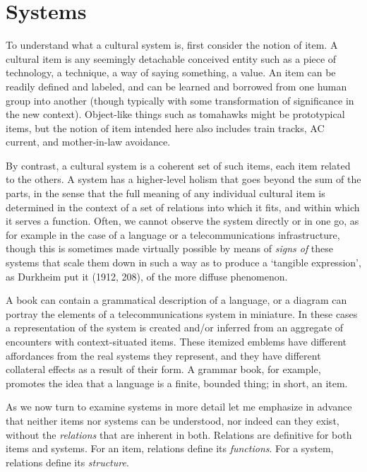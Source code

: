 \section{Systems}


To understand what a cultural system is, first consider the notion of 
item. A cultural item is any seemingly detachable conceived entity such 
as a piece of technology, a technique, a way of saying something, a 
value. An item can be readily defined and labeled, and can be learned 
and borrowed from one human group into another (though typically with 
some transformation of significance in the new context). Object-like 
things such as tomahawks might be prototypical items, but the notion of 
item intended here also includes train tracks, AC current, and 
mother-in-law avoidance. 



By contrast, a cultural system is a coherent set of such items, each 
item related to the others. A system has a higher-level holism that goes 
beyond the sum of the parts, in the sense that the full meaning of any 
individual cultural item is determined in the context of a set of 
relations into which it fits, and within which it serves a function. 
Often, we cannot observe the system directly or in one go, as for 
example in the case of a language or a telecommunications 
infrastructure, though this is sometimes made virtually possible by 
means of \textit{signs of} these systems that scale them down in such 
a way as to produce a \textquoteleft tangible expression', as Durkheim put it (1912, 
208), of the more diffuse phenomenon. 



A book can contain a grammatical description of a language, or a diagram 
can portray the elements of a telecommunications system in miniature. In 
these cases a representation of the system is created and/or inferred 
from an aggregate of encounters with context-situated items. These 
itemized emblems have different affordances from the real systems they 
represent, and they have different collateral effects as a result of 
their form. A grammar book, for example, promotes the idea that a 
language is a finite, bounded thing; in short, an item. 



As we now turn to examine systems in more detail let me emphasize in 
advance that neither items nor systems can be understood, nor indeed can 
they exist, without the \textit{relations }that are inherent in both. 
Relations are definitive for both items and systems. For an item, 
relations define its \textit{functions}. For a system, relations 
define its \textit{structure}.



